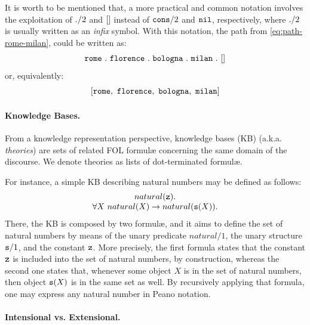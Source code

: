 \documentclass[12pt,a4paper,openright,twoside]{book}
\begin{document}
It is worth to be mentioned that, a more practical and common notation involves the exploitation of $\mathtt{.}/2$ and $\mathtt{[]}$ instead of $\mathtt{cons}/2$ and $\mathtt{nil}$, respectively, where $\mathtt{.}/2$ is usually written as an \emph{infix} symbol.
%
With this notation, the path from \cref{eq:path-rome-milan}, could be written as:
%
\begin{equation*}
    \mathtt{rome \mathtt{~.~} florence \mathtt{~.~} bologna \mathtt{~.~} milan \mathtt{~.~} []}
\end{equation*}
%
or, equivalently:
%
\begin{equation*}
    \functor{[rome,\ florence,\ bologna,\ milan]}
\end{equation*}


\paragraph{Knowledge Bases.}

From a knowledge representation perspective, knowledge bases (KB) (a.k.a. \emph{theories}) are sets of related FOL formul\ae{} concerning the same domain of the discourse.
%
We denote theories as lists of dot-terminated formul\ae.

For instance, a simple KB describing natural numbers may be defined as follows:
%
\begin{equation}\label{eq:kb-peano-naturals}
    \begin{array}{c}
        natural(\mathtt{z}).
        \\
        \forall X\ natural(X) \rightarrow natural(\mathtt{s}(X)).
    \end{array}
\end{equation}
%
There, the KB is composed by two formul\ae, and it aims to define the set of natural numbers by means of the unary predicate $natural/1$, the unary structure $\mathtt{s}/1$, and the constant $\mathtt{z}$.
%
More precisely, the first formula states that the constant $\mathtt{z}$ is included into the set of natural numbers, by construction, whereas the second one states that, whenever some object $X$ is in the set of natural numbers, then object $\mathtt{s}(X)$ is in the same set as well.
%
By recursively applying that formula, one may express any natural number in Peano notation.

\paragraph{Intensional vs. Extensional.}
\end{document}
